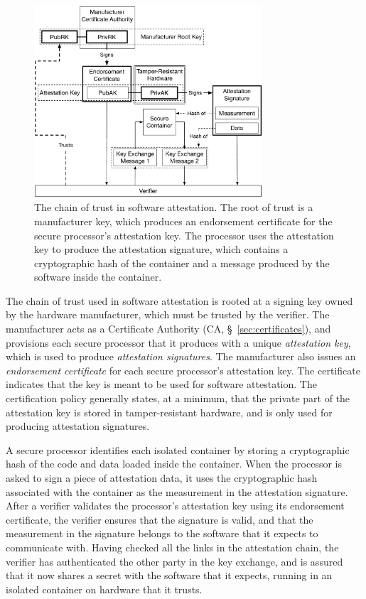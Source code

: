 \begin{figure}[hbt]
  \centering
  \includegraphics[width=85mm]{figures/generic_attestation_chain.pdf}
  \caption{
    The chain of trust in software attestation. The root of trust is a
    manufacturer key, which produces an endorsement certificate for the secure
    processor's attestation key. The processor uses the attestation key to
    produce the attestation signature, which contains a cryptographic hash of
    the container and a message produced by the software inside the container.
  }
  \label{fig:generic_attestation_chain}
\end{figure}

The chain of trust used in software attestation is rooted at a signing key
owned by the hardware manufacturer, which must be trusted by the verifier. The
manufacturer acts as a Certificate Authority (CA, \S~\ref{sec:certificates}),
and provisions each secure processor that it produces with a unique
\textit{attestation key}, which is used to produce
\textit{attestation signatures}. The manufacturer also
issues an \textit{endorsement certificate} for each secure processor's
attestation key. The certificate indicates that the key is meant to be used for
software attestation. The certification policy generally states, at a minimum,
that the private part of the attestation key is stored in tamper-resistant
hardware, and is only used for producing attestation signatures.

A secure processor identifies each isolated container by storing a
cryptographic hash of the code and data loaded inside the container. When the
processor is asked to sign a piece of attestation data, it uses the
cryptographic hash associated with the container as the measurement in the
attestation signature. After a verifier validates the processor's attestation
key using its endorsement certificate, the verifier ensures that the signature
is valid, and that the measurement in the signature belongs to the software
that it expects to communicate with. Having checked all the links in the
attestation chain, the verifier has authenticated the other party in the key
exchange, and is assured that it now shares a secret with the software that it
expects, running in an isolated container on hardware that it trusts.
